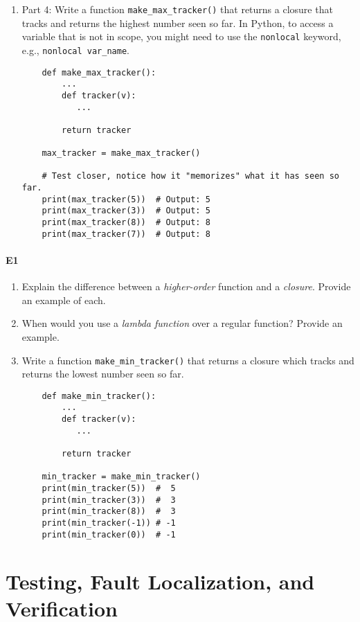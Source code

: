 \documentclass[oneside,11pt,dvipsnames]{book}
\newcommand{\code}[1]{\texttt{#1}}
\begin{document}
\begin{enumerate}
\item Part 4: Write a function \code{make\_max\_tracker()} that returns a closure that tracks and returns the highest number seen so far. In Python, to access a variable that is not in scope, you might need to use the \code{nonlocal} keyword, e.g., \code{nonlocal var\_name}.
\begin{lstlisting}
    def make_max_tracker():
        ...
        def tracker(v):
           ...
        
        return tracker

    max_tracker = make_max_tracker()

    # Test closer, notice how it "memorizes" what it has seen so far.
    print(max_tracker(5))  # Output: 5
    print(max_tracker(3))  # Output: 5
    print(max_tracker(8))  # Output: 8
    print(max_tracker(7))  # Output: 8
\end{lstlisting} 

\end{enumerate}

\subsection{E1}\label{exercise:e1}
\begin{enumerate}
    \item Explain the difference between a \emph{higher-order} function and a \emph{closure}. Provide an example of each.
    \item When would you use a \emph{lambda function} over a regular function? Provide an example.
    \item Write a function \code{make\_min\_tracker()} that returns a closure which tracks and returns the lowest number seen so far.
    \begin{lstlisting}
    def make_min_tracker():
        ...
        def tracker(v):
           ...
        
        return tracker

    min_tracker = make_min_tracker()
    print(min_tracker(5))  #  5
    print(min_tracker(3))  #  3
    print(min_tracker(8))  #  3
    print(min_tracker(-1)) # -1
    print(min_tracker(0))  # -1
    \end{lstlisting}
\end{enumerate}

\part{Testing, Fault Localization, and Verification}
\end{document}
